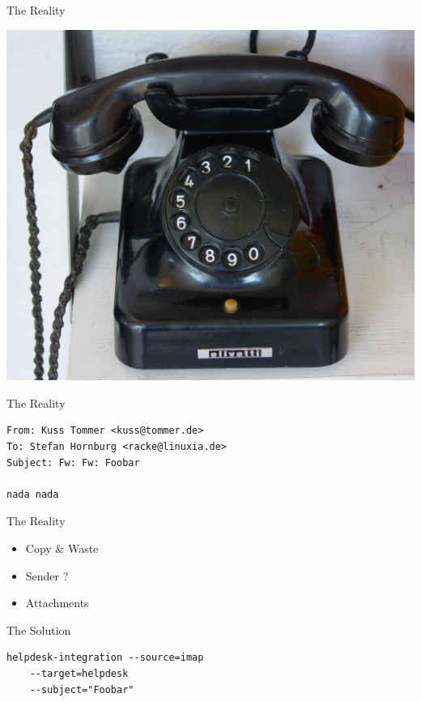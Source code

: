 \begin{frame}{The Reality}
\begin{center}
  \includegraphics[width=\textwidth,height=1\textheight,keepaspectratio]{pics/phone.jpg}
\end{center}
\end{frame}

\begin{frame}[fragile]{The Reality}
\begin{lstlisting}
From: Kuss Tommer <kuss@tommer.de>
To: Stefan Hornburg <racke@linuxia.de>
Subject: Fw: Fw: Foobar

nada nada
\end{lstlisting}
\end{frame}

\begin{frame}{The Reality}
\begin{itemize}
\item Copy \& Waste
\item Sender ?
\item Attachments
\end{itemize}
\end{frame}

\begin{frame}[fragile]{The Solution}
\begin{lstlisting}
helpdesk-integration --source=imap 
    --target=helpdesk 
    --subject="Foobar"
\end{lstlisting}
\end{frame}

